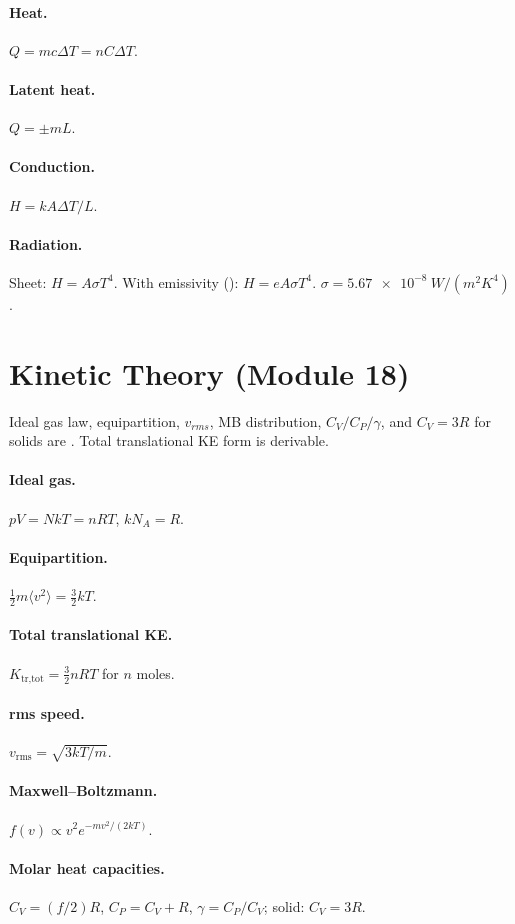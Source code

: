 \documentclass[11pt]{article}
\begin{document}
\paragraph{Heat.} $Q = mc\Delta T = nC\Delta T$.
\paragraph{Latent heat.} $Q = \pm m L$.
\paragraph{Conduction.} $H = kA\Delta T/L$.
\paragraph{Radiation.} Sheet: $H = A\sigma T^{4}$. With emissivity (): $H = eA\sigma T^4$. $\sigma = \SI{5.67e-8}{W/(m^{2} K^{4})}$.

\section{Kinetic Theory (Module 18)}
Ideal gas law, equipartition, $v_{rms}$, MB distribution, $C_V/C_P/\gamma$, and
$C_V=3R$ for solids are . Total translational KE form is
derivable.

\paragraph{Ideal gas.} $pV = NkT = nRT$, $kN_A = R$.
\paragraph{Equipartition.} $\tfrac{1}{2}m\langle v^{2}\rangle = \tfrac{3}{2}kT$.
\paragraph{Total translational KE.} $K_{\text{tr,tot}} = \tfrac{3}{2}nRT$ for $n$ moles.
\paragraph{rms speed.} $v_{\text{rms}} = \sqrt{3kT/m}$.
\paragraph{Maxwell--Boltzmann.} $f(v)\propto v^{2}e^{-mv^{2}/(2kT)}$.
\paragraph{Molar heat capacities.}
$C_V = (f/2)R$, $C_P = C_V + R$, $\gamma = C_P/C_V$; solid: $C_V = 3R$.
\end{document}
